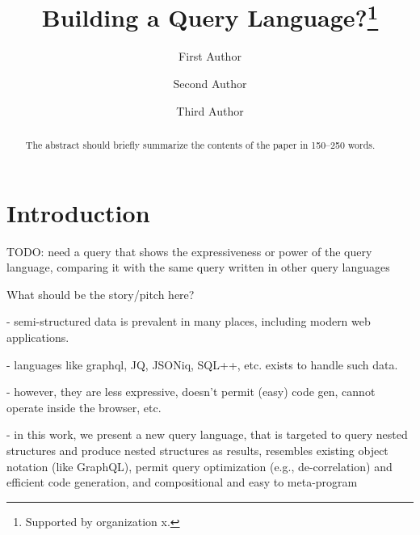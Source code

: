 \documentclass[runningheads]{llncs}
\begin{document}
%
\title{Building a Query Language?\thanks{Supported by organization x.}}
%
%
\author{First Author \and
Second Author \and
Third Author}
%
%
%
\maketitle              %
%
\begin{abstract}
The abstract should briefly summarize the contents of the paper in
150--250 words.

\end{abstract}
%
%
%
\section{Introduction}

TODO: need a query that shows the expressiveness or power of the query language, comparing it with the same query 
written in other query languages

What should be the story/pitch here?

- semi-structured data is prevalent in many places, including modern web applications.

- languages like graphql, JQ, JSONiq, SQL++, etc. exists to handle such data.

- however, they are less expressive, doesn't permit (easy) code gen, cannot operate inside the browser, etc.

- in this work, we present a new query language, that is targeted to query nested structures and produce
nested structures as results, resembles existing object notation (like GraphQL), permit query optimization (e.g., de-correlation)
and efficient code generation, and compositional and easy to meta-program
\end{document}

